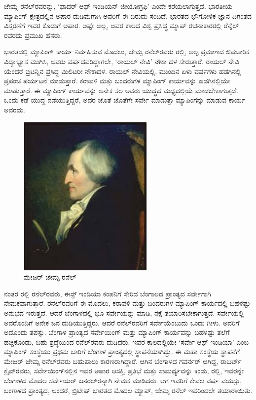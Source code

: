 ಜೇಮ್ಸ ರನೆಲ್​ರವರನ್ನು, ‘ಫಾದರ್​ ಆಫ್​ ಇಂಡಿಯನ್​ ಜೀಯೋಗ್ರಫಿ’ ಎಂದೇ ಕರೆಯಲಾಗುತ್ತದೆ. ಭಾರತೀಯ ಮ್ಯಾಪಿಂಗ್​ ಕ್ಷೇತ್ರದಲ್ಲಿನ ಅಪಾರ ದುಡಿಮೆಗಾಗಿ ಅವರಿಗೆ ಈ ಬಿರುದು ಸಂದಿದೆ. ಭಾರತದ ಭೌಗೋಳಿಕ ಜ್ಞಾನ ದಿಗಂತದ ವಿಸ್ತರಣೆಗೆ ಇವರ ಕೊಡುಗೆ ಅಪಾರ. ಅಷ್ಟೇ ಅಲ್ಲ, ಅವರ ಕಾಲದ ವಿಶ್ವ ಪ್ರಸಿದ್ಧ ಮ್ಯಾಪ್​ ರಚನಾಕಾರರಲ್ಲಿ ರೆನ್ನೆಲ್​ರವರದು ಪ್ರಮುಖ ಹೆಸರು.

\vskip 4pt

ಭಾರತದಲ್ಲಿ ಮ್ಯಾಪಿಂಗ್​ ಕಾರ್ಯ ನಿರ್ವಹಿಸುವ ಮೊದಲು, ಜೇಮ್ಸ ರನೆಲ್​ರವರು  ರಲ್ಲಿ, ಅಲ್ಪ ಪ್ರಮಾಣದ ಔಪಚಾರಿಕ ವಿದ್ಯಾಭ್ಯಾಸ ಮುಗಿಸಿ, ಅವರು  ವರ್ಷದವರಿದ್ದಾಗಲೇ, ‘ರಾಯಲ್​ ನೇವಿ’ ನೌಕಾ ದಳ ಸೇರುತ್ತಾರೆ. ರಾಯಲ್​ ನೇವಿ ಯೆಂದರೆ ಬ್ರಿಟನ್ನಿನ ಪ್ರಸಿದ್ಧ ಮಿಲಿಟರೀ ನೌಕಾದಳ. ರಾಯಲ್​ ನೇವಿಯಲ್ಲಿ, ಮುಂದಿನ ಏಳು ವರ್ಷಗಳು ಹಡಗಿನಲ್ಲಿ ಪ್ರಪಂಚ ಪರ್ಯಟನೆ ಮಾಡುತ್ತಾರೆ. ಕರಾವಳಿ ಮತ್ತು ಬಂದರುಗಳ ಮ್ಯಾಪಿಂಗ್​ ಕಾರ್ಯವನ್ನು ಹಡಗಿನಲ್ಲಿಯೇ ಮಾಡುತ್ತಾರೆ. ಈ ಮ್ಯಾಪಿಂಗ್​ ಕಾರ್ಯವನ್ನು ಅನೇಕ ಸಲ ಅವರು ಯುದ್ಧದ ಮಧ್ಯದಲ್ಲಿಯೆ ಮಾಡಬೇಕಾಗುತ್ತದೆೆ. ಒಂದು ಕಡೆ ಯುದ್ಧ ನಡೆಯುತ್ತಿದ್ದರೆ, ಅದರ ಜೊತೆ ಜೊತೆಗೇ ಸರ್ವೇ ಮಾಡುತ್ತಾ ಮ್ಯಾಪಿಂಗನ್ನು ಮಾಡುವ ಕಾರ್ಯ ಅವರದು.

\begin{figure}[!htbp]
\includegraphics[scale=0.65]{"images/image017.jpg"}
\caption{ಮೇಜರ್​ ಜೇಮ್ಸ ರನೆಲ್​}\label{art13-fig1}
\end{figure}

\newpage

ನಂತರ  ರಲ್ಲಿ ರನೆಲ್​ರವರು, ಈಸ್ಟ್​ ಇಂಡಿಯಾ ಕಂಪನಿಗೆ ಸೇರಿದ ಬೆಂಗಾಲದ ಪ್ರಾಂತ್ಯದ ಸರ್ವೇಗಾಗಿ ನೇಮಕವಾಗುತ್ತಾರೆ. ರನೆಲ್​ರವರಿಗೆ ಈ ಮೊದಲು, ಕರಾವಳಿ ಮತ್ತು ಬಂದರುಗಳ ಮ್ಯಾಪಿಂಗ್​ ಕಾರ್ಯದಲ್ಲಿ ಬಹಳಷ್ಟು ಅನುಭವ ಇರುತ್ತದೆ. ಆದರೆ ಬೆಂಗಾಳದಲ್ಲಿ ಭೂ ಸರ್ವೇಯನ್ನು ಮಾಡಿ, ನಕ್ಷೆ ತಯಾರಿಸಬೇಕಾಗುತ್ತದೆ. ಸರ್ವೇಯಲ್ಲಿ ಅವರೊಂದಿಗೆ ಅನೇಕ ಜನ ದುಡಿಯುತ್ತಿದ್ದರು. ಆದರೆ ರನೆಲ್​ರವರಿಗೆ ಸರ್ವೇಯೆಂಬುದು ಒಂದು ಗೀಳು. ಅವರಿಗೆ ಅದೊಂದು ತಪಸ್ಸು. ಬೆಂಗಾಳ ಪ್ರಾಂತ್ಯದ ಸರ್ವೇಯಿಂಗ್​ ಮತ್ತು ಮ್ಯಾಪಿಂಗ್​ ಕಾರ್ಯವನ್ನು ಬಹಳಷ್ಟು ತಲೆಗೆ ಹಚ್ಚಿಕೊಂಡು, ಬಹು ಶ್ರದ್ಧೆಯಿಂದ ರನೆಲ್​ರವರು ದುಡಿದರು. ಇವರ ಕಾಲದಲ್ಲಿಯೇ ‘ಸರ್ವೇ ಆಫ್​ ಇಂಡಿಯಾ’ ಎಂಬ ಮ್ಯಾಪಿಂಗ್​ ಸಂಸ್ಥೆಯು ಪ್ರಥಮ ಬಾರಿಗೆ ಬೆಂಗಾಳ ಪ್ರಾಂತ್ಯದಲ್ಲಿ ಸ್ಥಾಪನೆಯಾಗಿದ್ದು. ಈ ಮಹಾ ಸಂಸ್ಥೆಯ ಸ್ಥಾಪನೆಗೆ ಮೇಜರ್​ ಜೇಮ್ಸ ರನೆಲ್​ರವರು ಬಹುಪಾಲು ಕಾರಣರಾಗಿದ್ದಾರೆ. ಆಗಿನ ಬೆಂಗಾಳದ ಗವರ್ನರ್​ ಆಗಿದ್ದ, ರಾಬರ್ಟ್ ಕ್ಲೈವ್​ರವರು, ಸರ್ವೇಯಿಂಗ್​ನಲ್ಲಿನ ಇವರ ಅಪಾರ ಆಸಕ್ತಿ, ಪ್ರತಿಭೆ ಮತ್ತು ಸಾಮರ್ಥ್ಯವನ್ನು ಕಂಡು,  ರಲ್ಲಿ, ಇವರನ್ನೇ ಬೆಂಗಾಳದ ಮೊದಲ ಸರ್ವೇಯರ್​ ಜನರಲ್​ರನ್ನಾಗಿ ನೇಮಕ ಮಾಡಿದರು. ಆಗ ಇವರಿಗೆ ಕೇವಲ  ವರ್ಷ ವಯಸ್ಸು. ಬಂಗಾಳದ ಪ್ರಾಂತ್ಯದ, ಅಂದರೆ, ಬ್ರಿಟೀಷ್​ ಭಾರತದ ಮೊದಲ ಮ್ಯಾಪ್​, ಜೇಮ್ಸ ರನೆಲ್​ ಇವರಿಂದಲೇ ತಯಾರಾಯಿತು.

